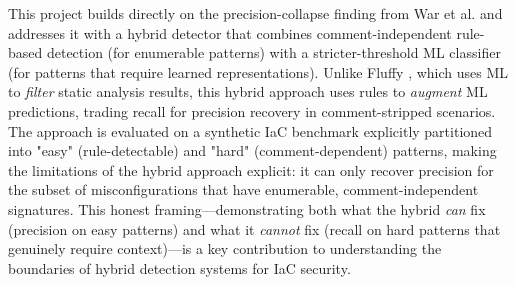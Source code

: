 This project builds directly on the precision-collapse finding from War et al. \cite{War25} and addresses it with a hybrid detector that combines comment-independent rule-based detection (for enumerable patterns) with a stricter-threshold ML classifier (for patterns that require learned representations). Unlike Fluffy \cite{Schuster23}, which uses ML to \emph{filter} static analysis results, this hybrid approach uses rules to \emph{augment} ML predictions, trading recall for precision recovery in comment-stripped scenarios. The approach is evaluated on a synthetic IaC benchmark explicitly partitioned into "easy" (rule-detectable) and "hard" (comment-dependent) patterns, making the limitations of the hybrid approach explicit: it can only recover precision for the subset of misconfigurations that have enumerable, comment-independent signatures. This honest framing—demonstrating both what the hybrid \emph{can} fix (precision on easy patterns) and what it \emph{cannot} fix (recall on hard patterns that genuinely require context)—is a key contribution to understanding the boundaries of hybrid detection systems for IaC security.
